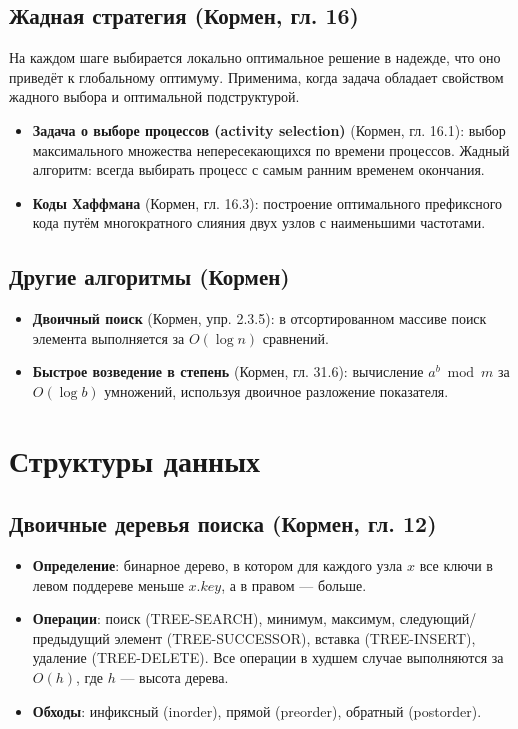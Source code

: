 \documentclass[a4paper,12pt]{article}
\begin{document}
\subsection{Жадная стратегия (Кормен, гл. 16)}
На каждом шаге выбирается локально оптимальное решение в надежде, что оно приведёт к глобальному оптимуму. Применима, когда задача обладает свойством жадного выбора и оптимальной подструктурой.
\begin{itemize}
    \item \textbf{Задача о выборе процессов (activity selection)} (Кормен, гл. 16.1): выбор максимального множества непересекающихся по времени процессов. Жадный алгоритм: всегда выбирать процесс с самым ранним временем окончания.
    \item \textbf{Коды Хаффмана} (Кормен, гл. 16.3): построение оптимального префиксного кода путём многократного слияния двух узлов с наименьшими частотами.
\end{itemize}

\subsection{Другие алгоритмы (Кормен)}
\begin{itemize}
    \item \textbf{Двоичный поиск} (Кормен, упр. 2.3.5): в отсортированном массиве поиск элемента выполняется за \( O(\log n) \) сравнений.
    \item \textbf{Быстрое возведение в степень} (Кормен, гл. 31.6): вычисление \( a^b \bmod m \) за \( O(\log b) \) умножений, используя двоичное разложение показателя.
\end{itemize}

\section{Структуры данных}

\subsection{Двоичные деревья поиска (Кормен, гл. 12)}
\begin{itemize}
    \item \textbf{Определение}: бинарное дерево, в котором для каждого узла \( x \) все ключи в левом поддереве меньше \( x.key \), а в правом --- больше.
    \item \textbf{Операции}: поиск (TREE-SEARCH), минимум, максимум, следующий/предыдущий элемент (TREE-SUCCESSOR), вставка (TREE-INSERT), удаление (TREE-DELETE). Все операции в худшем случае выполняются за \( O(h) \), где \( h \) --- высота дерева.
    \item \textbf{Обходы}: инфиксный (inorder), прямой (preorder), обратный (postorder).
\end{itemize}
\end{document}
